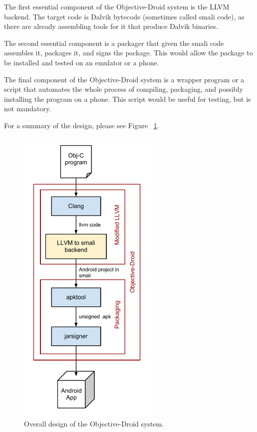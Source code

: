 \documentclass[parskip]{cs4rep}
\begin{document}
The first essential component of the Objective-Droid system is the LLVM backend. The target code is Dalvik bytecode (sometimes called smali code), as there are already assembling tools for it that produce Dalvik binaries.

The second essential component is a packager that given the smali code assembles it, packages it, and signs the package. This would allow the package to be installed and tested on an emulator or a phone.

The final component of the Objective-Droid system is a wrapper program or a script that automates the whole process of compiling, packaging, and possibly installing the program on a phone. This script would be useful for testing, but is not mandatory.

For a summary of the design, please see Figure ~\ref{fig:design}.

\begin{figure}[htp]
    \centering
        \includegraphics[width=0.6\textwidth]{design}
    \caption{Overall design of the Objective-Droid system.}
    \label{fig:design}    
\end{figure}
\end{document}
